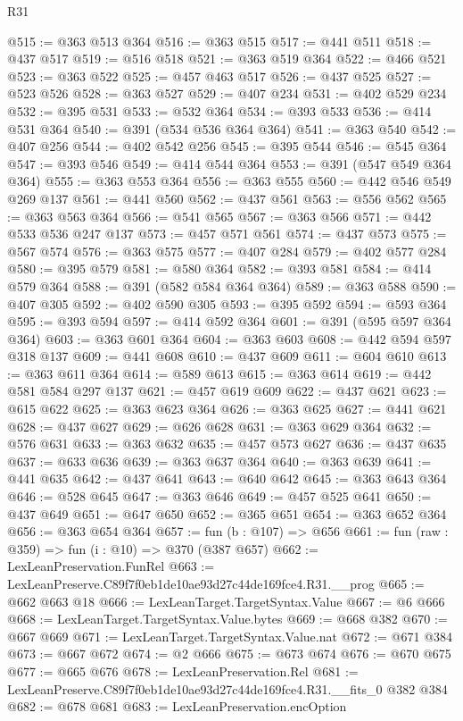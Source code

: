 \begin{lexlean}{R31}
\begin{coremodule}
@515 := @363 @513 @364
@516 := @363 @515
@517 := @441 @511
@518 := @437 @517
@519 := @516 @518
@521 := @363 @519 @364
@522 := @466 @521
@523 := @363 @522
@525 := @457 @463 @517
@526 := @437 @525
@527 := @523 @526
@528 := @363 @527
@529 := @407 @234
@531 := @402 @529 @234
@532 := @395 @531
@533 := @532 @364
@534 := @393 @533
@536 := @414 @531 @364
@540 := @391 (@534 @536 @364 @364)
@541 := @363 @540
@542 := @407 @256
@544 := @402 @542 @256
@545 := @395 @544
@546 := @545 @364
@547 := @393 @546
@549 := @414 @544 @364
@553 := @391 (@547 @549 @364 @364)
@555 := @363 @553 @364
@556 := @363 @555
@560 := @442 @546 @549 @269 @137
@561 := @441 @560
@562 := @437 @561
@563 := @556 @562
@565 := @363 @563 @364
@566 := @541 @565
@567 := @363 @566
@571 := @442 @533 @536 @247 @137
@573 := @457 @571 @561
@574 := @437 @573
@575 := @567 @574
@576 := @363 @575
@577 := @407 @284
@579 := @402 @577 @284
@580 := @395 @579
@581 := @580 @364
@582 := @393 @581
@584 := @414 @579 @364
@588 := @391 (@582 @584 @364 @364)
@589 := @363 @588
@590 := @407 @305
@592 := @402 @590 @305
@593 := @395 @592
@594 := @593 @364
@595 := @393 @594
@597 := @414 @592 @364
@601 := @391 (@595 @597 @364 @364)
@603 := @363 @601 @364
@604 := @363 @603
@608 := @442 @594 @597 @318 @137
@609 := @441 @608
@610 := @437 @609
@611 := @604 @610
@613 := @363 @611 @364
@614 := @589 @613
@615 := @363 @614
@619 := @442 @581 @584 @297 @137
@621 := @457 @619 @609
@622 := @437 @621
@623 := @615 @622
@625 := @363 @623 @364
@626 := @363 @625
@627 := @441 @621
@628 := @437 @627
@629 := @626 @628
@631 := @363 @629 @364
@632 := @576 @631
@633 := @363 @632
@635 := @457 @573 @627
@636 := @437 @635
@637 := @633 @636
@639 := @363 @637 @364
@640 := @363 @639
@641 := @441 @635
@642 := @437 @641
@643 := @640 @642
@645 := @363 @643 @364
@646 := @528 @645
@647 := @363 @646
@649 := @457 @525 @641
@650 := @437 @649
@651 := @647 @650
@652 := @365 @651
@654 := @363 @652 @364
@656 := @363 @654 @364
@657 := fun (b : @107) => @656
@661 := fun (raw : @359) => fun (i : @10) => @370 (@387 @657)
@662 := LexLeanPreservation.FunRel
@663 := LexLeanPreserve.C89f7f0eb1de10ae93d27c44de169fce4.R31.__prog
@665 := @662 @663 @18
@666 := LexLeanTarget.TargetSyntax.Value
@667 := @6 @666
@668 := LexLeanTarget.TargetSyntax.Value.bytes
@669 := @668 @382
@670 := @667 @669
@671 := LexLeanTarget.TargetSyntax.Value.nat
@672 := @671 @384
@673 := @667 @672
@674 := @2 @666
@675 := @673 @674
@676 := @670 @675
@677 := @665 @676
@678 := LexLeanPreservation.Rel
@681 := LexLeanPreserve.C89f7f0eb1de10ae93d27c44de169fce4.R31.__fits_0 @382 @384
@682 := @678 @681
@683 := LexLeanPreservation.encOption

\end{coremodule}
\end{lexlean}
